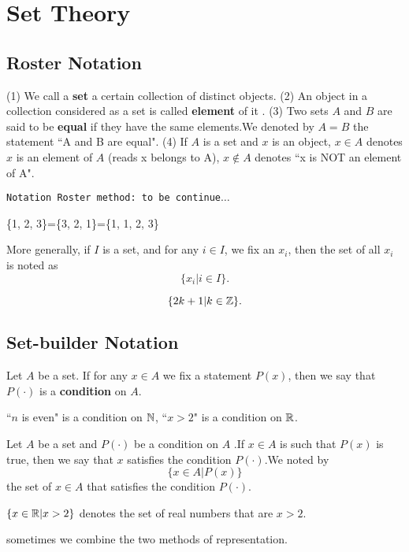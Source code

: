 \chapter{Set Theory}
\section{Roster Notation}
\begin{definitionenv}
    \quad
    \newline
    (1) We call a \textbf{set} a certain collection of distinct objects.
    \newline
    (2) An object in a collection considered as a set is called \textbf{element} of it .
    \newline
    (3) Two sets $A$ and $B$ are said to be \textbf{equal} if they have the same elements.We denoted by $A=B$ the statement ``A and B are equal".
    \newline
    (4) If $A$ is a set and $x$ is an object,  $x \in A$ denotes $x$ is an element of $A$ (reads x belongs to A),  $x \notin A$ denotes ``x is NOT an element of A".
\end{definitionenv}
\texttt{Notation Roster method: to be continue$\dots$}
\begin{exampleenv}
    \{1, 2, 3\}=\{3, 2, 1\}=\{1, 1, 2, 3\}
\end{exampleenv}
\begin{box2}
More generally,  if $I$ is a set,  and for any $i \in I$,  we fix an $x_i$,  then the set of all $x_i$ is noted as $$\{x_i|i\in I\}.$$
\end{box2}
\begin{exampleenv}
    $$\{2k+1|k\in \mathbb{Z}\}.$$
\end{exampleenv}
\section{Set-builder Notation}
\begin{definitionenv}
    Let $A$ be a set. If for any $x\in A $ we fix a statement $P(x)$,  then we say that $P(\cdot)$ is a \textbf{condition} on $A$. 
\end{definitionenv}
\begin{exampleenv}
    ``$n$ is even" is a condition on $\mathbb{N}$,  ``$x>2$" is a condition on $\mathbb{R}$.
\end{exampleenv}
\begin{definitionenv}
    Let $A$ be a set and $P(\cdot)$ be a condition on $A$ .If $x\in A$ is such that $P(x)$ is true,  then we say that $x$ satisfies the condition $P(\cdot)$.We noted by $$\{x \in A|P(x)\}$$the set of $x\in A$ that satisfies the condition $P(\cdot)$.
\end{definitionenv}
\begin{exampleenv}
    $\{x\in \mathbb{R}|x>2\}$ denotes the set of real numbers that are $x>2$.
\end{exampleenv}
\begin{box2}
\begin{center}
    sometimes we combine the two methods of representation.
\end{center}
\end{box2}




